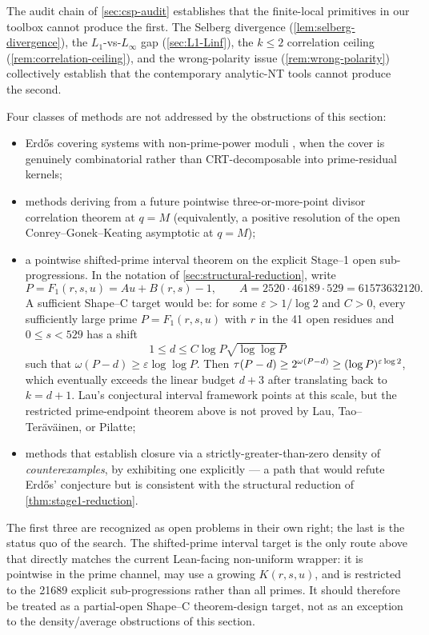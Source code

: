 The audit chain of \cref{sec:csp-audit} establishes that the
finite-local primitives in our toolbox cannot produce the first.
The Selberg divergence (\cref{lem:selberg-divergence}), the
$L_1$-vs-$L_\infty$ gap (\cref{sec:L1-Linf}), the $k \le 2$
correlation ceiling (\cref{rem:correlation-ceiling}), and the
wrong-polarity issue (\cref{rem:wrong-polarity}) collectively
establish that the contemporary analytic-NT tools cannot produce
the second.

\begin{remark}
\label{rem:what-remains-open}
Four classes of methods are not addressed by the obstructions of
this section:
\begin{itemize}[leftmargin=*]
\item Erd\H{o}s covering systems with non-prime-power moduli
  \cite{Hough2015, BBMST2022}, when the cover is genuinely
  combinatorial rather than CRT-decomposable into prime-residual
  kernels;
\item methods deriving from a future pointwise three-or-more-point
  divisor correlation theorem at $q = M$ (equivalently, a positive
  resolution of the open Conrey--Gonek--Keating asymptotic at
  $q = M$);
\item a pointwise shifted-prime interval theorem on the explicit
  Stage--1 open sub-progressions. In the notation of
  \cref{sec:structural-reduction}, write
  \[
    P = F_1(r,s,u) = A u + B(r,s)-1,
    \qquad A = 2520 \cdot 46189 \cdot 529 = 61573632120.
  \]
  A sufficient Shape--C target would be: for some
  $\varepsilon > 1/\log 2$ and $C>0$, every sufficiently large prime
  $P=F_1(r,s,u)$ with $r$ in the 41 open residues and
  $0 \le s < 529$ has a shift
  \[
    1 \le d \le C \log P \sqrt{\log\log P}
  \]
  such that $\omega(P-d) \ge \varepsilon \log\log P$.
  Then $\tau(P-d) \ge 2^{\omega(P-d)}
       \ge (\log P)^{\varepsilon\log 2}$, which eventually exceeds
  the linear budget $d+3$ after translating back to $k=d+1$.
  Lau's conjectural interval framework \cite{Lau2026} points at this
  scale, but the restricted prime-endpoint theorem above is not
  proved by Lau, Tao--Ter\"av\"ainen, or Pilatte;
\item methods that establish closure via a strictly-greater-than-zero
  density of \emph{counterexamples}, by exhibiting one explicitly ---
  a path that would refute Erd\H{o}s' conjecture but is consistent
  with the structural reduction of \cref{thm:stage1-reduction}.
\end{itemize}
The first three are recognized as open problems in their own right;
the last is the status quo of the search. The shifted-prime interval
target is the only route above that directly matches the current
Lean-facing non-uniform wrapper: it is pointwise in the prime channel,
may use a growing $K(r,s,u)$, and is restricted to the 21689 explicit
sub-progressions rather than all primes. It should therefore be
treated as a partial-open Shape--C theorem-design target, not as an
exception to the density/average obstructions of this section.
\end{remark}

